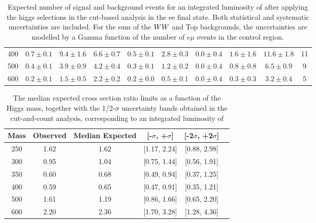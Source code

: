 \begin{table}[!ht]
{\begin{center}
\begin{tabular}{l | c c |  c c c c c c | c }
400 & $0.7\pm0.1$ & $9.4\pm1.6$ & $6.6\pm0.7$ & $0.5\pm0.1$ & $2.8\pm0.3$ & $0.0\pm0.4$ & $1.6\pm1.6$ & $11.6\pm1.8$ & 11 \\
500 & $0.4\pm0.1$ & $3.9\pm0.9$ & $4.2\pm0.4$ & $0.3\pm0.1$ & $1.2\pm0.2$ & $0.0\pm0.4$ & $0.8\pm0.8$ & $6.5\pm0.9$ & 9 \\
600 & $0.2\pm0.1$ & $1.5\pm0.5$ & $2.2\pm0.2$ & $0.2\pm0.0$ & $0.5\pm0.1$ & $0.0\pm0.4$ & $0.3\pm0.3$ & $3.2\pm0.4$ & 5 \\
\hline\hline
\end{tabular}
\end{center}
}
\caption{Expected number of signal and background events for an integrated luminosity of \intlumi after applying the higgs selections 
  in the cut-based analysis in the ee final state. Both statistical and systematic uncertainties are included. 
For the sum of the $WW$ and Top backgrounds, the uncertainties are modelled by a Gamma function of the number 
of $e\mu$ events in the control region.  }
\label{tab:yield_cutbased}
\end{table}

\begin{table}[!ht]
\begin{center}
\begin{tabular}{cccccc}
\hline\hline
Mass & Observed & Median Expected & [-$\sigma$, +$\sigma$] & [-2$\sigma$, +2$\sigma$]\\\hline
250 & 1.62 & 1.62 & [1.17, 2.24] & [0.88, 2.98] \\
300 & 0.95 & 1.04 & [0.75, 1.44] & [0.56, 1.91] \\
350 & 0.60 & 0.68 & [0.49, 0.94] & [0.37, 1.25] \\
400 & 0.59 & 0.65 & [0.47, 0.91] & [0.35, 1.21] \\
500 & 1.61 & 1.19 & [0.86, 1.66] & [0.65, 2.20] \\
600 & 2.20 & 2.36 & [1.70, 3.28] & [1.28, 4.36] \\
\hline\hline
\end{tabular}
\end{center}
\caption{The median expected cross section ratio limits as a function 
of the Higgs mass, together with the 1/2-$\sigma$ uncertainty bands obtained in the cut-and-count analysis, corresponding to 
an integrated luminosity of \intlumi}
\label{tab:limits_cutbased_5fb}
\end{table}

